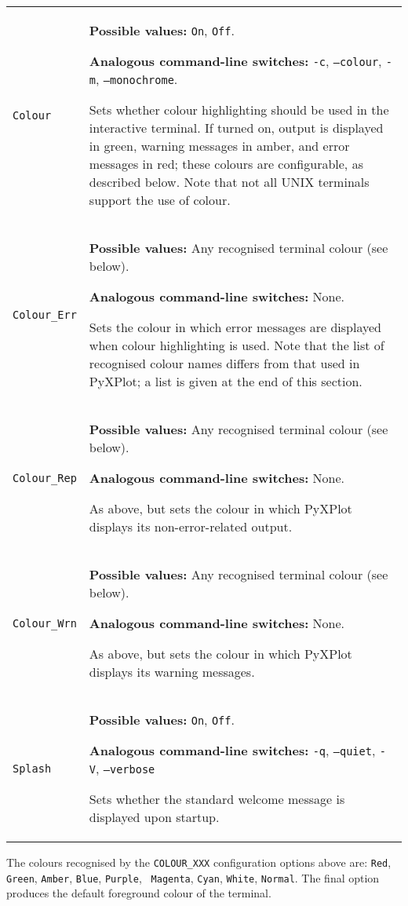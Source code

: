 \begin{longtable}{p{3.4cm}p{9cm}}
{\tt Colour} & {\bf Possible values:} {\tt On}, {\tt Off}.

               {\bf Analogous command-line switches:} {\tt -c}, {\tt --colour}, {\tt -m}, {\tt --monochrome}.

               Sets whether colour highlighting should be used in the interactive terminal. If turned on, output is displayed in green, warning messages in amber, and error messages in red; these colours are configurable, as described below. Note that not all UNIX terminals support the use of colour.
               \\
{\tt Colour\_Err} & {\bf Possible values:} Any recognised terminal colour (see below).

               {\bf Analogous command-line switches:} None.

               Sets the colour in which error messages are displayed when colour highlighting is used. Note that the list of recognised colour names differs from that used in PyXPlot; a list is given at the end of this section.
               \\
{\tt Colour\_Rep} & {\bf Possible values:} Any recognised terminal colour (see below).

               {\bf Analogous command-line switches:} None.

               As above, but sets the colour in which PyXPlot displays its non-error-related output.
               \\
{\tt Colour\_Wrn} & {\bf Possible values:} Any recognised terminal colour (see below).

               {\bf Analogous command-line switches:} None.

               As above, but sets the colour in which PyXPlot displays its warning messages.
               \\
{\tt Splash} & {\bf Possible values:} {\tt On}, {\tt Off}.

               {\bf Analogous command-line switches:} {\tt -q}, {\tt --quiet}, {\tt -V}, {\tt --verbose}

               Sets whether the standard welcome message is displayed upon startup.
               \\
\end{longtable}

The colours recognised by the {\tt COLOUR\_XXX} configuration options above
are: {\tt Red}, {\tt Green}, {\tt Amber}, {\tt Blue}, {\tt Purple}, {\tt
Magenta}, {\tt Cyan}, {\tt White}, {\tt Normal}. The final option produces the
default foreground colour of the terminal.

